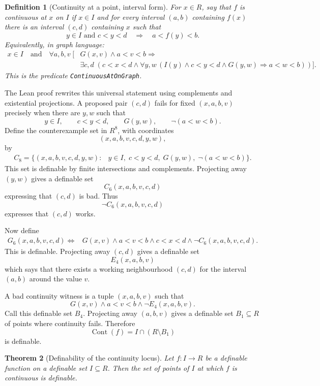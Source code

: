 \documentclass[11pt]{article}
\newtheorem{definition}{Definition}[section]
\newtheorem{theorem}[definition]{Theorem}
\newcommand{\Cont}{\operatorname{Cont}}
\begin{document}
\begin{definition}[Continuity at a point, interval form]
For $x\in R$, say that $f$ is continuous at $x$ on $I$ if $x\in I$ and for every interval $(a,b)$ containing $f(x)$ there is an interval $(c,d)$ containing $x$ such that
\[
  y\in I\text{ and }c<y<d
  \quad\Longrightarrow\quad
  a<f(y)<b.
\]
Equivalently, in graph language:
\[
\begin{aligned}
 x\in I\quad\text{and}\quad
 \forall a,b,v\;[&G(x,v)\land a<v<b\Rightarrow\\
 &\exists c,d\;(c<x<d\land
   \forall y,w\,(I(y)\land c<y<d\land G(y,w)\Rightarrow a<w<b))].
\end{aligned}
\]
This is the predicate \texttt{ContinuousAtOnGraph}.
\end{definition}

The Lean proof rewrites this universal statement using complements and existential projections. A proposed pair $(c,d)$ fails for fixed $(x,a,b,v)$ precisely when there are $y,w$ such that
\[
  y\in I,
  \qquad c<y<d,
  \qquad G(y,w),
  \qquad \neg(a<w<b).
\]
Define the counterexample set in $R^8$, with coordinates
\[
  (x,a,b,v,c,d,y,w),
\]
by
\[
\begin{aligned}
  C_8=\{(x,a,b,v,c,d,y,w):{}&y\in I,
  \;c<y<d,
  \;G(y,w),
  \;\neg(a<w<b)\}.
\end{aligned}
\]
This set is definable by finite intersections and complements.
Projecting away $(y,w)$ gives a definable set
\[
  C_6(x,a,b,v,c,d)
\]
expressing that $(c,d)$ is bad.
Thus
\[
  \neg C_6(x,a,b,v,c,d)
\]
expresses that $(c,d)$ works.

Now define
\[
\begin{aligned}
  G_6(x,a,b,v,c,d)\Longleftrightarrow{}&
  G(x,v)\land a<v<b\land c<x<d\land \neg C_6(x,a,b,v,c,d).
\end{aligned}
\]
This is definable. Projecting away $(c,d)$ gives a definable set
\[
  E_4(x,a,b,v)
\]
which says that there exists a working neighbourhood $(c,d)$ for the interval $(a,b)$ around the value $v$.

A bad continuity witness is a tuple $(x,a,b,v)$ such that
\[
  G(x,v)\land a<v<b\land \neg E_4(x,a,b,v).
\]
Call this definable set $B_4$. Projecting away $(a,b,v)$ gives a definable set $B_1\subseteq R$ of points where continuity fails. Therefore
\[
  \Cont(f)=I\cap (R\setminus B_1)
\]
is definable.

\begin{theorem}[Definability of the continuity locus]
Let $f:I\to R$ be a definable function on a definable set $I\subseteq R$. Then the set of points of $I$ at which $f$ is continuous is definable.
\end{theorem}
\end{document}
